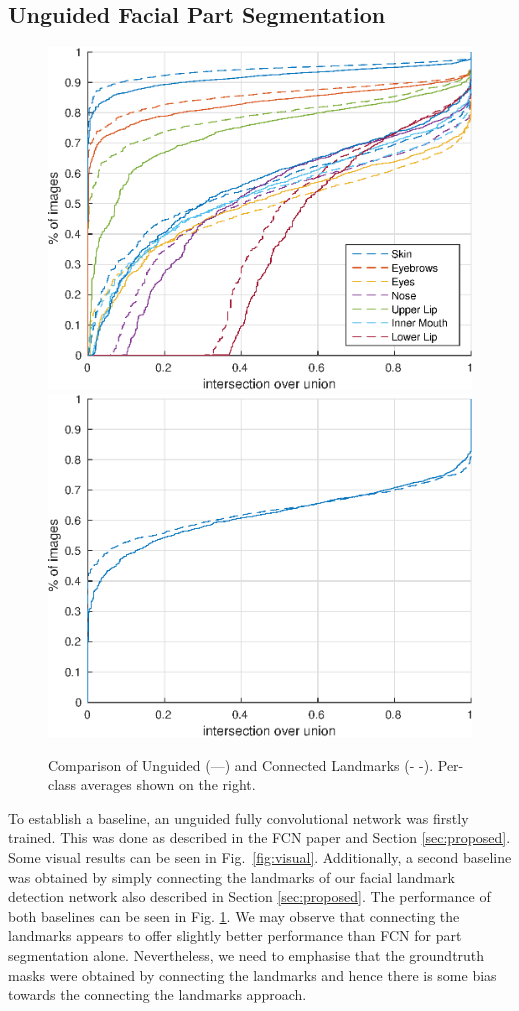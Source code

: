 

\subsection{Unguided Facial Part Segmentation}

\begin{figure}
\includegraphics[width=0.5\linewidth]{figs/lan-vs-un.eps}
\includegraphics[width=0.5\linewidth]{figs/lan-vs-un-mean.eps}
\caption[Unguided vs. Guided facial part segmentation]{Comparison of
  Unguided (---) and Connected Landmarks (-{ }-). Per-class averages
  shown on the right.}
\label{fig:lan-vs-un}
\end{figure}

To establish a baseline, an unguided fully convolutional network was
firstly trained. This was done as described in the FCN paper
\cite{long2015fully} and Section \ref{sec:proposed}. Some visual
results can be seen in Fig.~\ref{fig:visual}. Additionally, a second
baseline was obtained by simply connecting the landmarks of our facial
landmark detection network also described in Section
\ref{sec:proposed}. The performance of both baselines can be seen in
Fig. \ref{fig:lan-vs-un}. We may observe that connecting the landmarks
appears to offer slightly better performance than FCN for part
segmentation alone. Nevertheless, we need to emphasise that the
groundtruth masks were obtained by connecting the landmarks and hence
there is some bias towards the connecting the landmarks approach.

